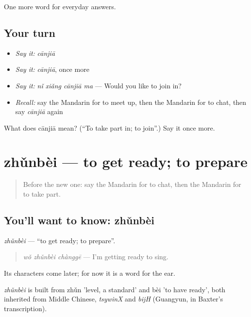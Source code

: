 \begin{grammarlens}[title={What you've built}]
One more word for everyday answers.
\end{grammarlens}

\subsection*{Your turn}
\begin{itemize}
\raggedright
  \item \emph{Say it:} \emph{cānjiā}
  \item \emph{Say it:} \emph{cānjiā}, once more
  \item \emph{Say it:} \emph{nǐ xiǎng cānjiā ma} — Would you like to join in?
  \item \emph{Recall:} say the Mandarin for to meet up, then the Mandarin for to chat, then say \emph{cānjiā} again
\end{itemize}

\begin{tcolorbox}[breakable,colback=teal!4,colframe=teal!35!black,title={Before you move on}]
What does cānjiā mean? (\textquotedblleft{}To take part in; to join\textquotedblright{}.) Say it once more.
\end{tcolorbox}
\section[zhǔnbèi]{zhǔnbèi — to get ready; to prepare}

\label{lesson:ZH-C84-zhunbei}



\begin{quote}
Before the new one: say the Mandarin for to chat, then the Mandarin for to take part.
\end{quote}

\subsection*{You'll want to know: zhǔnbèi}
\emph{zhǔnbèi} — \textquotedblleft{}to get ready; to prepare\textquotedblright{}.

\begin{quote}
\emph{wǒ zhǔnbèi chànggē} — I'm getting ready to sing.
\end{quote}

Its characters come later; for now it is a word for the ear.

\begin{cousinweb}
\emph{zhǔnbèi} is built from zhǔn 'level, a standard' and bèi 'to have ready', both inherited from Middle Chinese, \emph{tsywinX} and \emph{bijH} (Guangyun, in Baxter's transcription).
\end{cousinweb}

